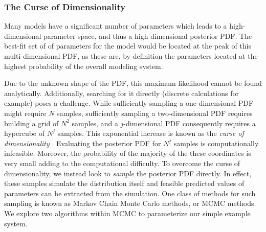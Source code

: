 \documentclass{article}
\begin{document}
\subsubsection{The Curse of Dimensionality}
Many models have a significant number of parameters which leads to a high-dimensional parameter space, and thus a high dimensional posterior PDF. The best-fit set of of parameters for the model would be located at the peak of this multi-dimensional PDF, as these are, by definition the parameters located at the highest probability of the overall modeling system. 
\par Due to the unknown shape of the PDF, this maximum likelihood cannot be found analytically. Additionally, searching for it directly (discrete calculations for example) poses a challenge. While sufficiently sampling a one-dimensional PDF might require $N$ samples, sufficiently sampling a two-dimensional PDF requires building a grid of $N^{2}$ samples, and a $j$-dimensional PDF consequently requires a hypercube of $N^{j}$ samples. This exponential increase is known as the \emph{curse of dimensionality} \cite{astrostats}. Evaluating the posterior PDF for $N^{j}$ samples is computationally infeasible. Moreover, the probability of the majority of the these coordinates is very small adding to the computational difficulty. To overcome the curse of dimensionality, we instead look to \emph{sample} the posterior PDF directly. In effect, these samples simulate the distribution itself and feasible predicted values of parameters can be extracted from the simulation. One class of methods for such sampling is known as Markov Chain Monte Carlo methods, or MCMC methods. We explore two algorithms within MCMC to parameterize our simple example system. 
\end{document}
